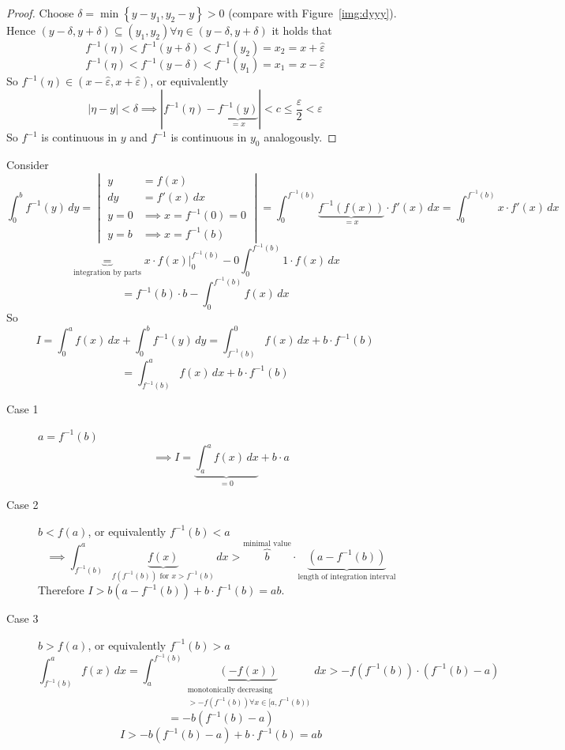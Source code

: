 \documentclass{article}
\newcommand{\set}[1]{\left\{#1\right\}}
\newcommand{\card}[1]{\left|#1\right|}
\begin{document}
\begin{proof}
  Choose $\delta = \min\set{y - y_1, y_2 - y} > 0$ (compare with Figure~\ref{img:dyyy}).
  Hence $(y - \delta, y + \delta) \subseteq (y_1, y_2) \forall \eta \in (y - \delta, y + \delta)$ it holds that
  \[ f^{-1}(\eta) < f^{-1}(y + \delta) < f^{-1}(y_2) = x_2 = x + \hat\varepsilon \]
  \[ f^{-1}(\eta) < f^{-1}(y - \delta) < f^{-1}(y_1) = x_1 = x - \hat\varepsilon \]
  So $f^{-1}(\eta) \in (x - \hat{\varepsilon}, x + \hat{\varepsilon})$, or equivalently
  \[ \card{\eta - y} < \delta \implies \card{f^{-1}(\eta) - \underbrace{f^{-1}(y)}_{=x}} < c \leq \frac{\varepsilon}{2} < \varepsilon \]
  So $f^{-1}$ is continuous in $y$ and $f^{-1}$ is continuous in $y_0$ analogously.
\end{proof}

Consider
\[
  \int_0^b f^{-1}(y) \, dy = \begin{vmatrix}
    y &= f(x) \\
    dy &= f'(x) \, dx \\
    y = 0 &\implies x = f^{-1}(0) = 0 \\
    y = b &\implies x = f^{-1}(b)
  \end{vmatrix}
  = \int_0^{f^{-1}(b)} \underbrace{f^{-1}(f(x))}_{=x} \cdot f'(x) \, dx = \int_0^{f^{-1}(b)} x \cdot f'(x) \, dx
\] \[
  \underbrace{=}_{\text{integration by parts}}
  \left. x \cdot f(x) \right|_0^{f^{-1}(b)} - 0 \int_0^{f^{-1}(b)} 1 \cdot f(x) \, dx
\] \[
  = f^{-1}(b) \cdot b - \int_0^{f^{-1}(b)} f(x) \, dx
\]
So
\[
  I = \int_0^a f(x) \, dx + \int_0^b f^{-1}(y) \, dy = \int_{f^{-1}(b)}^0 f(x) \, dx + b \cdot f^{-1}(b)
\] \[
  = \int_{f^{-1}(b)}^a f(x) \, dx + b \cdot f^{-1}(b)
\]

\begin{description}
  \item[Case 1] $a = f^{-1}(b)$
    \[ \implies I = \underbrace{\int_a^a f(x) \, dx}_{=0} + b \cdot a \]
  \item[Case 2] $b < f(a)$, or equivalently $f^{-1}(b) < a$
    \[ \implies \int_{f^{-1}(b)}^a \underbrace{f(x)}_{f(f^{-1}(b)) \text{ for } x > f^{-1}(b)} \, dx > \overbrace{b}^{\text{minimal value}} \cdot \underbrace{(a - f^{-1}(b))}_{\text{length of integration interval}}  \]
    Therefore $I > b(a - f^{-1}(b)) + b \cdot f^{-1}(b) = ab$.
  \item[Case 3] $b > f(a)$, or equivalently $f^{-1}(b) > a$
    \[ \int_{f^{-1}(b)}^a f(x) \, dx = \int_a^{f^{-1}(b)} \underbrace{(-f(x))}_{\substack{\text{monotonically decreasing} \\ > -f(f^{-1}(b)) \forall x \in [a,f^{-1}(b))}} \, dx > -f(f^{-1}(b)) \cdot (f^{-1}(b) - a) \]
    \[ = -b(f^{-1}(b) - a) \]
    \[ I > -b (f^{-1}(b) - a) + b \cdot f^{-1}(b) = ab \]
\end{description}
\end{document}
